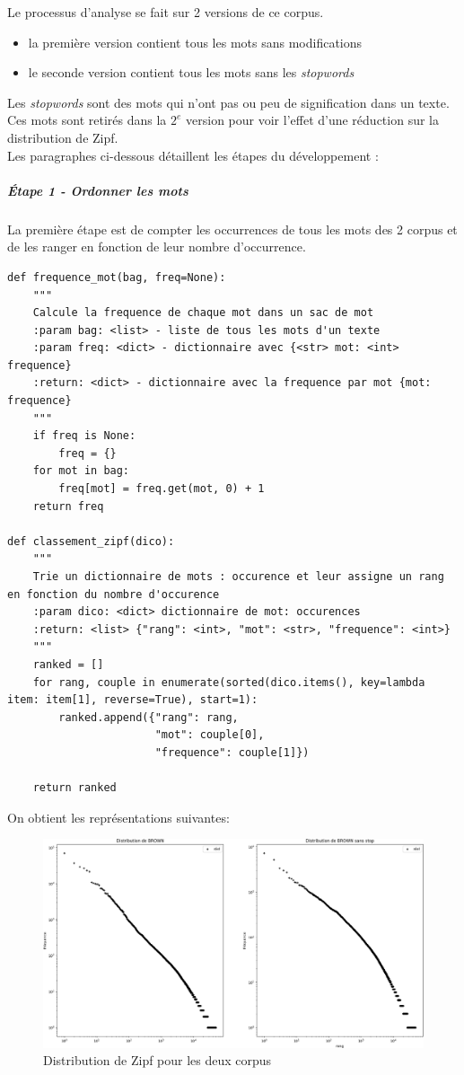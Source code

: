 \documentclass[a4paper,12pt]{article}
\begin{document}
		Le processus d'analyse se fait sur 2 versions de ce corpus.
		\begin{itemize}
			\item la première version contient tous les mots sans modifications
			\item le seconde version contient tous les mots sans les \emph{stopwords}
		\end{itemize}
		Les \emph{stopwords} sont des mots qui n'ont pas ou peu de signification dans un texte. Ces mots sont retirés dans la $2^e$ version pour voir l'effet d'une réduction sur la distribution de Zipf. \\
		
		Les paragraphes ci-dessous détaillent les étapes du développement :
		
		\subparagraph{Étape 1 - Ordonner les mots}
			La première étape est de compter les occurrences de tous les mots des 2 corpus et de les ranger en fonction de leur nombre d’occurrence. 
			\begin{lstlisting}[title=Triage des mots]
def frequence_mot(bag, freq=None):
    """
    Calcule la frequence de chaque mot dans un sac de mot
    :param bag: <list> - liste de tous les mots d'un texte
    :param freq: <dict> - dictionnaire avec {<str> mot: <int> frequence}
    :return: <dict> - dictionnaire avec la frequence par mot {mot: frequence}
    """
    if freq is None:
        freq = {}
    for mot in bag:
        freq[mot] = freq.get(mot, 0) + 1
    return freq
		
def classement_zipf(dico):
    """
    Trie un dictionnaire de mots : occurence et leur assigne un rang en fonction du nombre d'occurence
    :param dico: <dict> dictionnaire de mot: occurences
    :return: <list> {"rang": <int>, "mot": <str>, "frequence": <int>}
    """
    ranked = []
    for rang, couple in enumerate(sorted(dico.items(), key=lambda item: item[1], reverse=True), start=1):
        ranked.append({"rang": rang,
                       "mot": couple[0],
                       "frequence": couple[1]})

    return ranked \end{lstlisting}
    
    		
    		On obtient les représentations suivantes: 
		\begin{figure}[H]
				\includegraphics[width=\linewidth]{img/distribZipf.png}
				\caption{Distribution de Zipf pour les deux corpus}
			\end{figure}    		
    		
\end{document}
